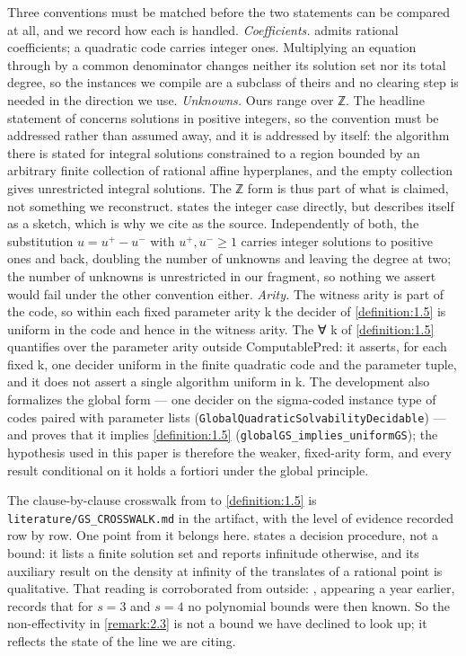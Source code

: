\documentclass[11pt]{article}
\theoremstyle{plain}
\theoremstyle{definition}
\theoremstyle{remark}
\theoremstyle{plain}
\theoremstyle{definition}
\theoremstyle{remark}
\theoremstyle{plain}
\theoremstyle{definition}
\theoremstyle{remark}
\begin{document}
Three conventions must be matched before the two statements can be compared at all, and we record how each is handled. \emph{Coefficients.} \cite{GS04} admits rational coefficients; a quadratic code carries integer ones. Multiplying an equation through by a common denominator changes neither its solution set nor its total degree, so the instances we compile are a subclass of theirs and no clearing step is needed in the direction we use. \emph{Unknowns.} Ours range over ℤ. The headline statement of \cite{GS04} concerns solutions in positive integers, so the convention must be addressed rather than assumed away, and it is addressed by \cite{GS04} itself: the algorithm there is stated for integral solutions constrained to a region bounded by an arbitrary finite collection of rational affine hyperplanes, and the empty collection gives unrestricted integral solutions. The ℤ form is thus part of what is claimed, not something we reconstruct. \cite{GS81} states the integer case directly, but describes itself as a sketch, which is why we cite \cite{GS04} as the source. Independently of both, the substitution $u = u^{+} − u^{-}$ with $u^{+}, u^{-} ≥ 1$ carries integer solutions to positive ones and back, doubling the number of unknowns and leaving the degree at two; the number of unknowns is unrestricted in our fragment, so nothing we assert would fail under the other convention either. \emph{Arity.} The witness arity is part of the code, so within each fixed parameter arity k the decider of \cref{definition:1.5} is uniform in the code and hence in the witness arity. The ∀ k of \cref{definition:1.5} quantifies over the parameter arity outside \textrm{ComputablePred}: it asserts, for each fixed k, one decider uniform in the finite quadratic code and the parameter tuple, and it does not assert a single algorithm uniform in k. The development also formalizes the global form — one decider on the sigma-coded instance type of codes paired with parameter lists (\texttt{GlobalQuadraticSolvabilityDecidable}) — and proves that it implies \cref{definition:1.5} (\texttt{globalGS\_\allowbreak{}implies\_\allowbreak{}uniformGS}); the hypothesis used in this paper is therefore the weaker, fixed-arity form, and every result conditional on it holds a fortiori under the global principle.

The clause-by-clause crosswalk from \cite{GS04} to \cref{definition:1.5} is \texttt{literature/GS\_\allowbreak{}CROSSWALK.\allowbreak{}md} in the artifact, with the level of evidence recorded row by row. One point from it belongs here. \cite{GS04} states a decision procedure, not a bound: it lists a finite solution set and reports infinitude otherwise, and its auxiliary result on the density at infinity of the translates of a rational point is qualitative. That reading is corroborated from outside: \cite{Die03}, appearing a year earlier, records that for $s = 3$ and $s = 4$ no polynomial bounds were then known. So the non-effectivity in \cref{remark:2.3} is not a bound we have declined to look up; it reflects the state of the line we are citing.
\end{document}
